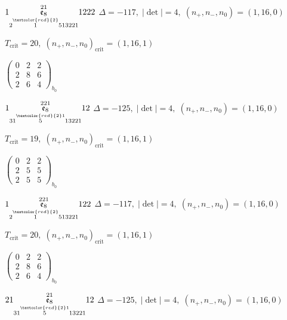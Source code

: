 \documentclass[10pt]{article}
\begin{document}
$1\overset{21}{\underset{2\overset{\textcolor{red}{2}}{1}513221}{\mathfrak{e}_8}}1222$ \quad $\Delta=-117,\; |\det|=4,\; (n_+,n_-,n_0)=(1,16,0)$

\hspace{1em}$T_{\text{crit}}=20,\; (n_+,n_-,n_0)_{\text{crit}}=(1,16,1)$

\hspace{2em}$\left(\begin{smallmatrix}0 & 2 & 2 \\ 2 & 8 & 6 \\ 2 & 6 & 4\end{smallmatrix}\right)_{\!b_0}$

\smallskip

$1\overset{221}{\underset{31\overset{\textcolor{red}{2}1}{5}13221}{\mathfrak{e}_8}}12$ \quad $\Delta=-125,\; |\det|=4,\; (n_+,n_-,n_0)=(1,16,0)$

\hspace{1em}$T_{\text{crit}}=19,\; (n_+,n_-,n_0)_{\text{crit}}=(1,16,1)$

\hspace{2em}$\left(\begin{smallmatrix}0 & 2 & 2 \\ 2 & 5 & 5 \\ 2 & 5 & 5\end{smallmatrix}\right)_{\!b_0}$

\smallskip

$1\overset{221}{\underset{2\overset{\textcolor{red}{2}}{1}513221}{\mathfrak{e}_8}}122$ \quad $\Delta=-117,\; |\det|=4,\; (n_+,n_-,n_0)=(1,16,0)$

\hspace{1em}$T_{\text{crit}}=20,\; (n_+,n_-,n_0)_{\text{crit}}=(1,16,1)$

\hspace{2em}$\left(\begin{smallmatrix}0 & 2 & 2 \\ 2 & 8 & 6 \\ 2 & 6 & 4\end{smallmatrix}\right)_{\!b_0}$

\smallskip

$21\overset{21}{\underset{31\overset{\textcolor{red}{2}1}{5}13221}{\mathfrak{e}_8}}12$ \quad $\Delta=-125,\; |\det|=4,\; (n_+,n_-,n_0)=(1,16,0)$
\end{document}
